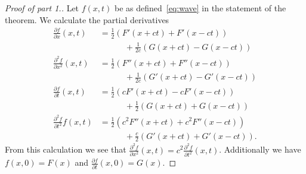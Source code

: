 \begin{proof}[Proof of part 1.]
    Let \(f(x,t)\) be as defined~\eqref{eq:wave} in the statement of the theorem.
    We calculate the partial derivatives
    \[
        \begin{aligned}
            \tfrac{\partial f}{\partial x} (x,t)
             & = \tfrac{1}{2} \left(F'(x+ct) + F'(x-ct)\right)          \\
             & \quad\quad\quad
            + \tfrac{1}{2c}\left(G(x+ct) - G(x-ct)\right)               \\
            \tfrac{\partial^2 f}{\partial x^2}(x,t)
             & = \tfrac{1}{2} \left(F''(x+ct) + F''(x-ct)\right)        \\
             & \quad\quad\quad
            + \tfrac{1}{2c}\left(G'(x+ct) - G'(x-ct)\right)             \\
            \tfrac{\partial f}{\partial t} (x,t)
             & = \tfrac{1}{2} \left(cF'(x+ct) - c F'(x-ct)\right)       \\
             & \quad\quad\quad
            + \tfrac{1}{2}\left(G(x+ct) + G(x-ct)\right)                \\
            \tfrac{\partial^2 f}{\partial t^2} f(x,t)
             & = \tfrac{1}{2} \left(c^2F''(x+ct) + c^2 F''(x-ct)\right) \\
             & \quad\quad\quad
            + \tfrac{c}{2}\left(G'(x+ct) + G'(x-ct)\right).
        \end{aligned}
    \]
    From this calculation we see that  \(   \frac{\partial^2 f}{\partial x^2}(x,t) = c^2  \frac{\partial^2 f}{\partial t^2}(x,t) \).
    Additionally we have \(f(x,0) = F(x)\)
    and \(\frac{\partial f}{\partial t}(x,0) = G(x)\).
\end{proof}

